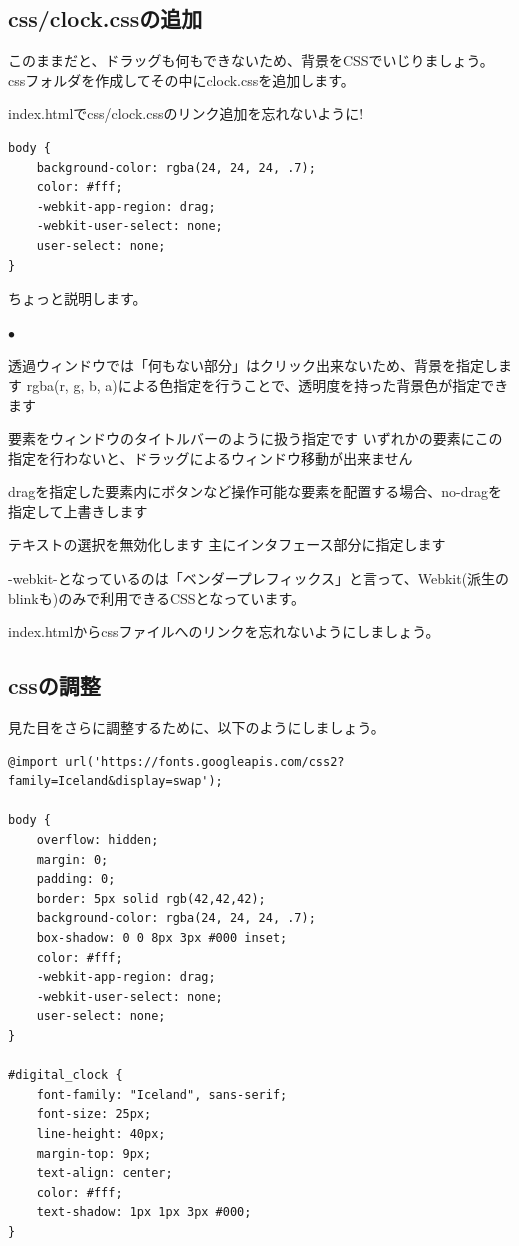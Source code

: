 \documentclass[mingoth,11pt,a4j,uplatex]{jsarticle}
\renewenvironment{description}%
{%
   \begin{list}{\parbox{1zw}{$\bullet$}}%
   {%
      \setlength{\topsep}{1zh}
      \setlength{\itemindent}{3zw}
      \setlength{\leftmargin}{5zw}%
      \setlength{\rightmargin}{0zw}%
      \setlength{\labelsep}{1zw}%
      \setlength{\labelwidth}{3zw}%
      \setlength{\itemsep}{0em}%
      \setlength{\parsep}{0em}%
      \setlength{\listparindent}{0zw}%
   }
}{%
   \end{list}%
}
\begin{document}
\subsection{css/clock.cssの追加}
このままだと、ドラッグも何もできないため、背景をCSSでいじりましょう。
cssフォルダを作成してその中にclock.cssを追加します。

index.htmlでcss/clock.cssのリンク追加を忘れないように!

\begin{lstlisting}[caption=DigitalClock：css/clock.css ]
body {
    background-color: rgba(24, 24, 24, .7);
    color: #fff;
    -webkit-app-region: drag;
    -webkit-user-select: none;
    user-select: none; 
}
\end{lstlisting}

ちょっと説明します。
\begin{description}
\item[背景色/背景画像]
透過ウィンドウでは「何もない部分」はクリック出来ないため、背景を指定します
rgba(r, g, b, a)による色指定を行うことで、透明度を持った背景色が指定できます
\item[-webkit-app-region: drag;]
要素をウィンドウのタイトルバーのように扱う指定です
いずれかの要素にこの指定を行わないと、ドラッグによるウィンドウ移動が出来ません
\item[-webkit-app-region: no-drag;]
dragを指定した要素内にボタンなど操作可能な要素を配置する場合、no-dragを指定して上書きします
\item[-webkit-user-select: none;]
テキストの選択を無効化します
主にインタフェース部分に指定します
\end{description}

-webkit-となっているのは「ベンダープレフィックス」と言って、Webkit(派生のblinkも)のみで利用できるCSSとなっています。

index.htmlからcssファイルへのリンクを忘れないようにしましょう。
\subsection{cssの調整}
見た目をさらに調整するために、以下のようにしましょう。
\begin{lstlisting}[caption=DigitalClock：css/clock.css ]
@import url('https://fonts.googleapis.com/css2?family=Iceland&display=swap');

body {
    overflow: hidden;
    margin: 0;
    padding: 0;
    border: 5px solid rgb(42,42,42);
    background-color: rgba(24, 24, 24, .7);
    box-shadow: 0 0 8px 3px #000 inset;
    color: #fff;
    -webkit-app-region: drag;
    -webkit-user-select: none;
    user-select: none;
}

#digital_clock {
    font-family: "Iceland", sans-serif;
    font-size: 25px;
    line-height: 40px;
    margin-top: 9px;
    text-align: center;
    color: #fff;
    text-shadow: 1px 1px 3px #000;
}
\end{lstlisting}
\end{document}
